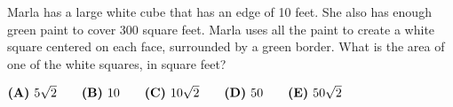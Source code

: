 

Marla has a large white cube that has an edge of 10 feet. She also has enough green paint to cover 300 square feet. Marla uses all the paint to create a white square centered on each face, surrounded by a green border. What is the area of one of the white squares, in square feet?

$\textbf{(A)}\hspace{.05in}5\sqrt2 \qquad \textbf{(B)}\hspace{.05in}10 \qquad \textbf{(C)}\hspace{.05in}10\sqrt2 \qquad \textbf{(D)}\hspace{.05in}50 \qquad \textbf{(E)}\hspace{.05in}50\sqrt2 $
